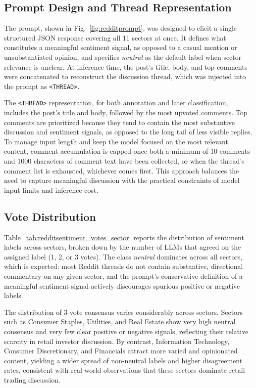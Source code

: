\subsection{Prompt Design and Thread Representation}
\label{sec:redditprompt}

The prompt, shown in Fig.~\ref{fig:redditprompt}, was designed to elicit a single structured JSON response covering all 11 sectors at once. It defines what constitutes a meaningful sentiment signal, as opposed to a casual mention or unsubstantiated opinion, and specifies \textit{neutral} as the default label when sector relevance is unclear. At inference time, the post's title, body, and top comments were concatenated to reconstruct the discussion thread, which was injected into the prompt as \texttt{<THREAD>}.

The \texttt{<THREAD>} representation, for both annotation and later classification, includes the post's title and body, followed by the most upvoted comments. Top comments are prioritized because they tend to contain the most substantive discussion and sentiment signals, as opposed to the long tail of less visible replies. To manage input length and keep the model focused on the most relevant content, comment accumulation is capped once both a minimum of $\num{10}$ comments and $\num{1000}$ characters of comment text have been collected, or when the thread's comment list is exhausted, whichever comes first. This approach balances the need to capture meaningful discussion with the practical constraints of model input limits and inference cost.


\subsection{Vote Distribution}
\label{sec:redditvote_distribution}

Table~\ref{tab:redditsentiment_votes_sector} reports the distribution of sentiment labels across sectors, broken down by the number of LLMs that agreed on the assigned label (1, 2, or 3 votes). The class \textit{neutral} dominates across all sectors, which is expected: most Reddit threads do not contain substantive, directional commentary on any given sector, and the prompt's conservative definition of a meaningful sentiment signal actively discourages spurious positive or negative labels.

The distribution of 3-vote consensus varies considerably across sectors. Sectors such as Consumer Staples, Utilities, and Real Estate show very high neutral consensus and very few clear positive or negative signals, reflecting their relative scarcity in retail investor discussion. By contrast, Information Technology, Consumer Discretionary, and Financials attract more varied and opinionated content, yielding a wider spread of non-neutral labels and higher disagreement rates, consistent with real-world observations that these sectors dominate retail trading discussion.

